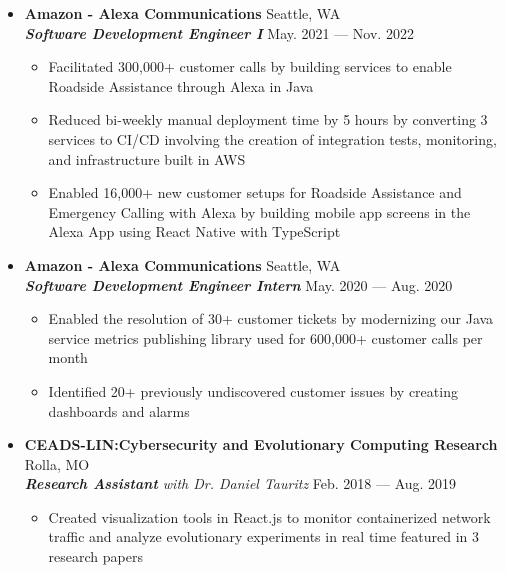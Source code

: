 \documentclass[9pt,oneside]{memoir}
\begin{document}
\begin{itemize}
      \item[] \textbf{Amazon - Alexa Communications}
            \hfill Seattle, WA\\
            \textit{\textbf{Software Development Engineer I}}
            \hfill May. 2021 --- Nov. 2022
            \begin{itemize}
                  \item[\textbullet] Facilitated 300,000+ customer calls by building services to enable Roadside Assistance through Alexa in Java
                  \item[\textbullet] Reduced bi-weekly manual deployment time by 5 hours by converting 3 services to CI/CD involving the creation of integration tests, monitoring, and infrastructure built in AWS 
                  \item[\textbullet] Enabled 16,000+ new customer setups for Roadside Assistance and Emergency Calling with Alexa by building mobile app screens in the Alexa App using React Native with TypeScript
            \end{itemize}
      
      \item[] \textbf{Amazon - Alexa Communications}
            \hfill Seattle, WA\\
            \textit{\textbf{Software Development Engineer Intern}}
            \hfill May. 2020 --- Aug. 2020
            \begin{itemize}
                  \item[\textbullet] Enabled the resolution of 30+ customer tickets by modernizing our Java service metrics publishing library used for 600,000+ customer calls per month
                  \item[\textbullet] Identified 20+ previously undiscovered customer issues by creating dashboards and alarms
            \end{itemize}

      \item[] \textbf{CEADS-LIN:\@ Cybersecurity and Evolutionary Computing Research}
            \hfill Rolla, MO\\
            \textit{\textbf{Research Assistant} with Dr. Daniel Tauritz}
            \hfill Feb. 2018 --- Aug. 2019
            \begin{itemize}
                  \item[\textbullet] Created visualization tools in React.js to
                        monitor containerized network traffic and analyze evolutionary experiments
                        in real time featured in 3 research papers
            \end{itemize}


\end{itemize}
\end{document}
